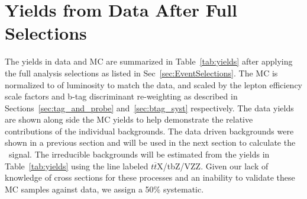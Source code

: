          
	\section{Yields from Data After Full Selections}
	The yields in data and MC are summarized in Table~\ref{tab:yields} after applying the full analysis selections as listed in Sec~\ref{sec:EventSelections}. The MC is normalized to \intLumi of luminosity to match the data, and scaled by the lepton efficiency scale factors and b-tag discriminant re-weighting as described in Sections~\ref{sec:tag_and_probe} and~\ref{sec:btag_syst} respectively. The data yields are shown along side the MC yields to help demonstrate the relative contributions of the individual backgrounds. The data driven backgrounds were shown in a previous section and will be used in the next section to calculate the \ttZ \ signal. The irreducible backgrounds will be estimated from the yields in Table~\ref{tab:yields} using the line labeled $t\overline{t}$X/tbZ/VZZ. Given our lack of knowledge of cross sections for these processes and an inability to validate these MC samples against data, we assign a 50\% systematic.

